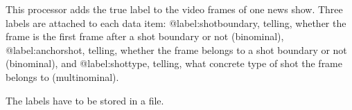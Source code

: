 This processor adds the true label to the video frames of one news show. Three labels are attached to each data item: @label:shotboundary, telling, whether the frame is the first frame after a shot boundary or not (binominal), @label:anchorshot, telling, whether the frame belongs to a shot boundary or not (binominal), and @label:shottype, telling, what concrete type of shot the frame belongs to (multinominal).

The labels have to be stored in a file.